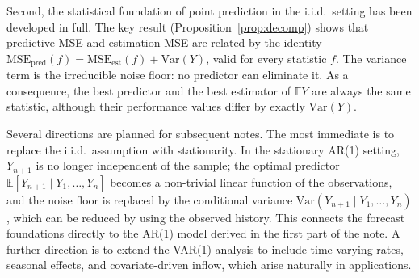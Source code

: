 \documentclass[a4paper,oneside,12pt]{extarticle}
\theoremstyle{plain}
\theoremstyle{definition}
\theoremstyle{remark}
\newcommand*{\E}{\mathbb{E}}
\begin{document}
Second, the statistical foundation of point prediction in the i.i.d.\
setting has been developed in full. The key result
(Proposition~\ref{prop:decomp}) shows that predictive MSE and estimation
MSE are related by the identity
$\mathrm{MSE}_\mathrm{pred}(f) = \mathrm{MSE}_\mathrm{est}(f) + \mathrm{Var}(Y)$,
valid for every statistic $f$. The variance term is the irreducible noise
floor: no predictor can eliminate it. As a consequence, the best predictor
and the best estimator of $\E Y$ are always the same statistic, although
their performance values differ by exactly $\mathrm{Var}(Y)$.

Several directions are planned for subsequent notes. The most immediate is
to replace the i.i.d.\ assumption with stationarity. In the stationary
AR(1) setting, $Y_{n+1}$ is no longer independent of the sample; the
optimal predictor $\E[Y_{n+1} \mid Y_1,\ldots,Y_n]$ becomes a non-trivial
linear function of the observations, and the noise floor is replaced by
the conditional variance $\mathrm{Var}(Y_{n+1} \mid Y_1,\ldots,Y_n)$,
which can be reduced by using the observed history. This connects the
forecast foundations directly to the AR(1) model derived in the first part
of the note. A further direction is to extend the VAR(1) analysis to
include time-varying rates, seasonal effects, and covariate-driven inflow,
which arise naturally in applications.
\end{document}
